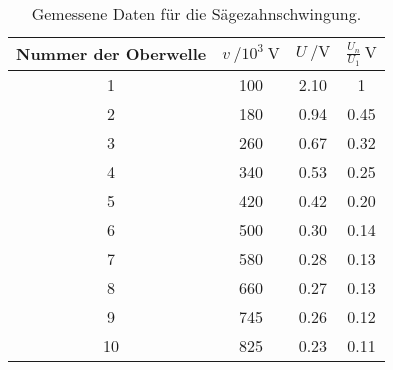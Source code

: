 \begin{table}[H]
  \centering
   \begin{tabular}{c c c c}
    \toprule
    Nummer der Oberwelle & $ v \:/10^{3}\: \si{\volt}$ & $ U\: / \si{\volt} $ &
    $ \frac{U_{n}}{U_{1}} \: \si{\volt} $  \\
    \midrule
    1 & 100 & 2.10 & 1 \\
    2 & 180 & 0.94 & 0.45 \\
    3 & 260 & 0.67 & 0.32 \\
    4 & 340 & 0.53 & 0.25 \\
    5 & 420 & 0.42 & 0.20 \\
    6 & 500 & 0.30 & 0.14 \\
    7 & 580 & 0.28 & 0.13 \\
    8 & 660 & 0.27 & 0.13 \\
    9 & 745 & 0.26 & 0.12 \\
    10 & 825 & 0.23 & 0.11 \\
    \bottomrule
  \end{tabular}
  \caption{Gemessene Daten für die Sägezahnschwingung.}
  \label{tab:tabe3}
\end{table}
